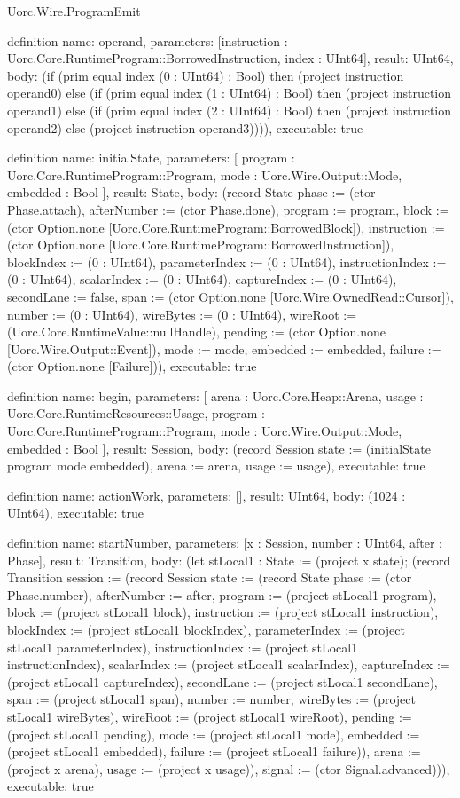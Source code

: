\begin{lexlean}{Uorc.Wire.ProgramEmit}
\begin{semanticmodule}
definition{
  name: operand,
  parameters: [instruction : Uorc.Core.RuntimeProgram::BorrowedInstruction, index : UInt64],
  result: UInt64,
  body: (if (prim equal index (0 : UInt64) : Bool) then (project instruction operand0) else (if (prim equal index (1 : UInt64) : Bool) then (project instruction operand1) else (if (prim equal index (2 : UInt64) : Bool) then (project instruction operand2) else (project instruction operand3)))),
  executable: true
}

definition{
  name: initialState,
  parameters: [
    program : Uorc.Core.RuntimeProgram::Program,
    mode : Uorc.Wire.Output::Mode,
    embedded : Bool
  ],
  result: State,
  body: (record State {phase := (ctor Phase.attach), afterNumber := (ctor Phase.done), program := program, block := (ctor Option.none [Uorc.Core.RuntimeProgram::BorrowedBlock]), instruction := (ctor Option.none [Uorc.Core.RuntimeProgram::BorrowedInstruction]), blockIndex := (0 : UInt64), parameterIndex := (0 : UInt64), instructionIndex := (0 : UInt64), scalarIndex := (0 : UInt64), captureIndex := (0 : UInt64), secondLane := false, span := (ctor Option.none [Uorc.Wire.OwnedRead::Cursor]), number := (0 : UInt64), wireBytes := (0 : UInt64), wireRoot := (Uorc.Core.RuntimeValue::nullHandle), pending := (ctor Option.none [Uorc.Wire.Output::Event]), mode := mode, embedded := embedded, failure := (ctor Option.none [Failure])}),
  executable: true
}

definition{
  name: begin,
  parameters: [
    arena : Uorc.Core.Heap::Arena,
    usage : Uorc.Core.RuntimeResources::Usage,
    program : Uorc.Core.RuntimeProgram::Program,
    mode : Uorc.Wire.Output::Mode,
    embedded : Bool
  ],
  result: Session,
  body: (record Session {state := (initialState program mode embedded), arena := arena, usage := usage}),
  executable: true
}

definition{
  name: actionWork,
  parameters: [],
  result: UInt64,
  body: (1024 : UInt64),
  executable: true
}

definition{
  name: startNumber,
  parameters: [x : Session, number : UInt64, after : Phase],
  result: Transition,
  body: (let stLocal1 : State := (project x state); (record Transition {session := (record Session {state := (record State {phase := (ctor Phase.number), afterNumber := after, program := (project stLocal1 program), block := (project stLocal1 block), instruction := (project stLocal1 instruction), blockIndex := (project stLocal1 blockIndex), parameterIndex := (project stLocal1 parameterIndex), instructionIndex := (project stLocal1 instructionIndex), scalarIndex := (project stLocal1 scalarIndex), captureIndex := (project stLocal1 captureIndex), secondLane := (project stLocal1 secondLane), span := (project stLocal1 span), number := number, wireBytes := (project stLocal1 wireBytes), wireRoot := (project stLocal1 wireRoot), pending := (project stLocal1 pending), mode := (project stLocal1 mode), embedded := (project stLocal1 embedded), failure := (project stLocal1 failure)}), arena := (project x arena), usage := (project x usage)}), signal := (ctor Signal.advanced)})),
  executable: true
}


\end{semanticmodule}
\end{lexlean}
